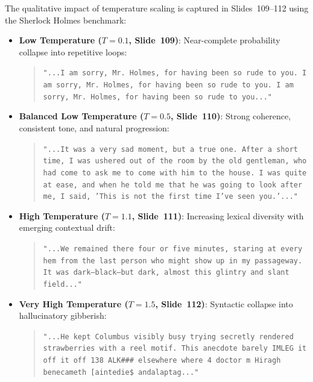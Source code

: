 \documentclass[../../main.tex]{subfiles}
\begin{document}
The qualitative impact of temperature scaling is captured in Slides~109--112 using the Sherlock Holmes benchmark:
\begin{itemize}
    \item \textbf{Low Temperature ($T = 0.1$, Slide~109)}: Near-complete probability collapse into repetitive loops:
    \begin{quote}
    \texttt{"...I am sorry, Mr. Holmes, for having been so rude to you. I am sorry, Mr. Holmes, for having been so rude to you. I am sorry, Mr. Holmes, for having been so rude to you..."}
    \end{quote}
    
    \item \textbf{Balanced Low Temperature ($T = 0.5$, Slide~110)}: Strong coherence, consistent tone, and natural progression:
    \begin{quote}
    \texttt{"...It was a very sad moment, but a true one. After a short time, I was ushered out of the room by the old gentleman, who had come to ask me to come with him to the house. I was quite at ease, and when he told me that he was going to look after me, I said, 'This is not the first time I've seen you.'..."}
    \end{quote}
    
    \item \textbf{High Temperature ($T = 1.1$, Slide~111)}: Increasing lexical diversity with emerging contextual drift:
    \begin{quote}
    \texttt{"...We remained there four or five minutes, staring at every hem from the last person who might show up in my passageway. It was dark---black---but dark, almost this glintry and slant field..."}
    \end{quote}
    
    \item \textbf{Very High Temperature ($T = 1.5$, Slide~112)}: Syntactic collapse into hallucinatory gibberish:
    \begin{quote}
    \texttt{"...He kept Columbus visibly busy trying secretly rendered strawberries with a reel motif. This anecdote barely IMLEG it off it off 138 ALK\#\#\# elsewhere where 4 doctor m Hiragh benecameth [aintedie\$ andalaptag..."}
    \end{quote}
\end{itemize}
\end{document}
